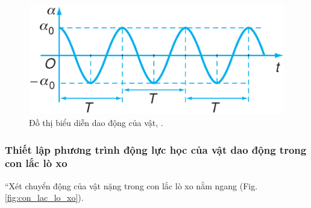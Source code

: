 \documentclass{article}
\numberwithin{equation}{section}
\begin{document}
\begin{figure}[H]
	\centering
	\includegraphics[scale=0.15]{do_thi_dao_dong}
	\caption{Đồ thị biểu diễn dao động của vật, \cite[Hình 6.2, p. 29]{SGK_Vat_Ly_12_nang_cao}.}
	\label{fig:do_thi_dao_dong}
\end{figure}

\subsubsection{Thiết lập phương trình động lực học của vật dao động trong con lắc lò xo}
``Xét chuyển động của vật nặng trong con lắc lò xo nằm ngang (Fig. \ref{fig:con_lac_lo_xo}).
\end{document}
